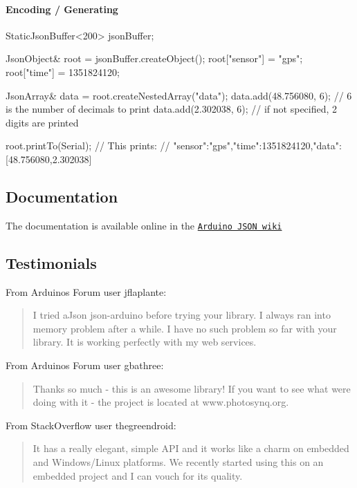 \paragraph*{Encoding / Generating}

\begin{DoxyVerb}StaticJsonBuffer<200> jsonBuffer;

JsonObject& root = jsonBuffer.createObject();
root["sensor"] = "gps";
root["time"] = 1351824120;

JsonArray& data = root.createNestedArray("data");
data.add(48.756080, 6);  // 6 is the number of decimals to print
data.add(2.302038, 6);   // if not specified, 2 digits are printed

root.printTo(Serial);
// This prints:
// {"sensor":"gps","time":1351824120,"data":[48.756080,2.302038]}
\end{DoxyVerb}


\subsection*{Documentation }

The documentation is available online in the \href{https://github.com/bblanchon/ArduinoJson/wiki}{\tt Arduino J\+S\+O\+N wiki}

\subsection*{Testimonials }

From Arduino\textquotesingle{}s Forum user {\ttfamily jflaplante}\+: \begin{quote}
I tried a\+Json json-\/arduino before trying your library. I always ran into memory problem after a while. I have no such problem so far with your library. It is working perfectly with my web services. \end{quote}


From Arduino\textquotesingle{}s Forum user {\ttfamily gbathree}\+: \begin{quote}
Thanks so much -\/ this is an awesome library! If you want to see what we\textquotesingle{}re doing with it -\/ the project is located at www.\+photosynq.\+org. \end{quote}


From Stack\+Overflow user {\ttfamily thegreendroid}\+: \begin{quote}
It has a really elegant, simple A\+P\+I and it works like a charm on embedded and Windows/\+Linux platforms. We recently started using this on an embedded project and I can vouch for its quality. \end{quote}


